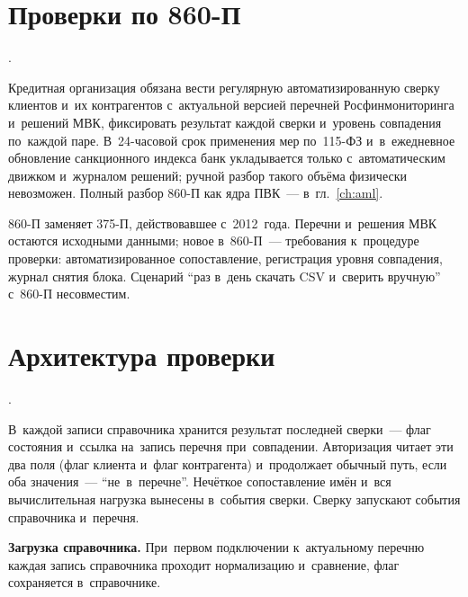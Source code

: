\section{Проверки по 860-П}\label{sec:sanctions-rf-modern}

.

Кредитная организация обязана вести регулярную автоматизированную сверку
клиентов и~их контрагентов с~актуальной версией перечней Росфинмониторинга
и~решений МВК, фиксировать результат каждой сверки и~уровень совпадения
по~каждой паре. В~24-часовой срок применения мер по~115-ФЗ и~в~ежедневное
обновление санкционного индекса банк укладывается только с~автоматическим
движком и~журналом решений; ручной разбор такого объёма физически
невозможен. Полный разбор 860-П как ядра ПВК~--- в~гл.~\ref{ch:aml}.

860-П заменяет 375-П, действовавшее с~2012~года. Перечни и~решения МВК
остаются исходными данными; новое в~860-П~--- требования к~процедуре проверки:
автоматизированное сопоставление, регистрация уровня совпадения, журнал
снятия блока. Сценарий \enquote{раз в~день скачать
CSV и~сверить вручную} с~860-П несовместим.

\section{Архитектура проверки}\label{sec:sanctions-screening-flow}

.

В~каждой записи справочника хранится результат последней сверки~--- флаг
состояния и~ссылка на~запись перечня при~совпадении. Авторизация читает эти
два поля (флаг клиента и~флаг контрагента) и~продолжает обычный путь, если
оба значения~--- \enquote{не~в~перечне}. Нечёткое сопоставление имён и~вся
вычислительная нагрузка вынесены в~события сверки. Сверку запускают события
справочника и~перечня.

\textbf{Загрузка справочника.} При~первом подключении к~актуальному перечню
каждая запись справочника проходит нормализацию и~сравнение, флаг
сохраняется в~справочнике.

